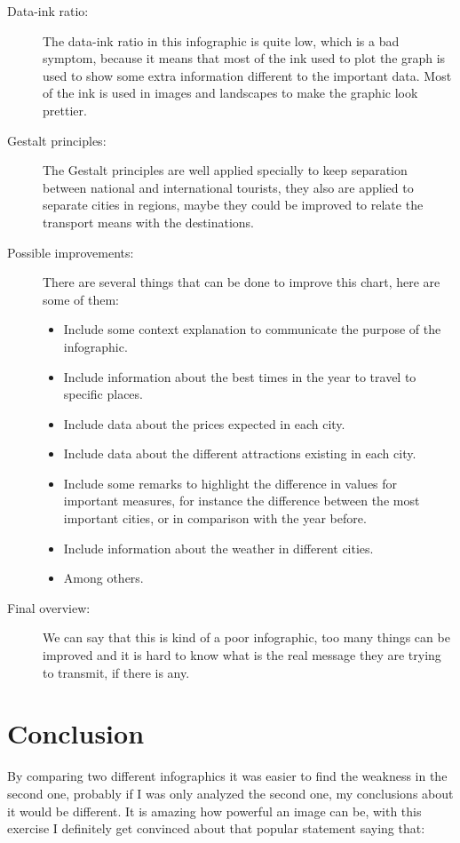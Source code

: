 \documentclass{article}
\begin{document}
\begin{description}
    \item[Data-ink ratio:] The data-ink ratio in this infographic is quite low, which is a bad symptom, because it means that most of the ink used to plot the graph is used to show some extra information different to the important data. Most of the ink is used in images and landscapes to make the graphic look prettier.
    \item[Gestalt principles:] The Gestalt principles are well applied specially to keep separation between national and international tourists, they also are applied to separate cities in regions, maybe they could be improved to relate the transport means with the destinations.
    \item[Possible improvements:]
      There are several things that can be done to improve this chart, here are some of them:
      \begin{itemize}
        \item Include some context explanation to communicate the purpose of the infographic.
        \item Include information about the best times in the year to travel to specific places.
        \item Include data about the prices expected in each city.
        \item Include data about the different attractions existing in each city.
        \item Include some remarks to highlight the difference in values for important measures, for instance the difference between the most important cities, or in comparison with the year before.
        \item Include information about the weather in different cities.
        \item Among others.
      \end{itemize}
    \item[Final overview:]We can say that this is kind of a poor infographic, too many things can be improved and it is hard to know what is the real message they are trying to transmit, if there is any.
  \end{description}

\newpage
\section{Conclusion}
  By comparing two different infographics it was easier to find the weakness in the second one, probably if I was only analyzed the second one, my conclusions about it would be different.
  It is amazing how powerful an image can be, with this exercise I definitely get convinced about that popular statement saying that:
\end{document}
